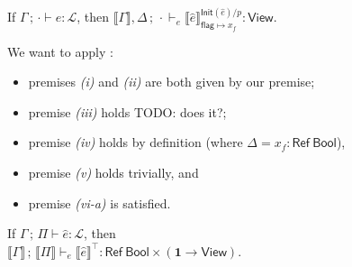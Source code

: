 \documentclass{article}
\newcommand{\mf}[1]{\mathsf{#1}}
\newcommand{\mc}[1]{\mathcal{#1}}
\newcommand{\mb}[1]{\mathbf{#1}}
\newcommand{\semi}{\,;\,}
\newcommand{\hl}[1]{\colorbox{LightGoldenrod1}{#1}}
\newcommand{\llrr}[1]{\llbracket #1 \rrbracket}
\newcommand{\tone}{\mb{1}}
\newcommand{\tbool}{\mf{Bool}}
\newcommand{\tview}{\mf{View}}
\newcommand{\tref}[1]{\mf{Ref}\ #1}
\newcommand{\Ell}{\mc{L}}
\begin{document}
\begin{corollary}
\label{thm:sprezinit}
If $\Gamma \semi \cdot \vdash \hat{e}: \Ell$,
then $\llrr{\Gamma}, \Delta \semi \cdot
\vdash_e
\llrr{\hat{e}}^{\mf{Init}(\hat{e})/p}_{\mf{flag} \mapsto x_f}: \mf{View}$.

\begin{Proof}
We want to apply :
\begin{itemize}
\item premises \emph{(i)} and \emph{(ii)} 
are both given by our premise;
\item premise \emph{(iii)} holds \hl{TODO: does it?};
\item premise \emph{(iv)} holds by definition 
(where $\Delta=x_f: \tref{\tbool}$),
\item premise \emph{(v)} holds trivially, and
\item premise \emph{(vi-a)} is satisfied.
\end{itemize}
\end{Proof}
\end{corollary}

\begin{theorem}
\label{thm:oldtprezbod}
If $\Gamma \semi \Pi \vdash \hat{e}: \Ell$,
then\\$\llrr{\Gamma} \semi \llrr{\Pi} 
\vdash_e
\llrr{\hat{e}}^{\top}: 
\tref{\tbool} \times (\tone \rightarrow \tview)$.
\end{theorem}
\end{document}
